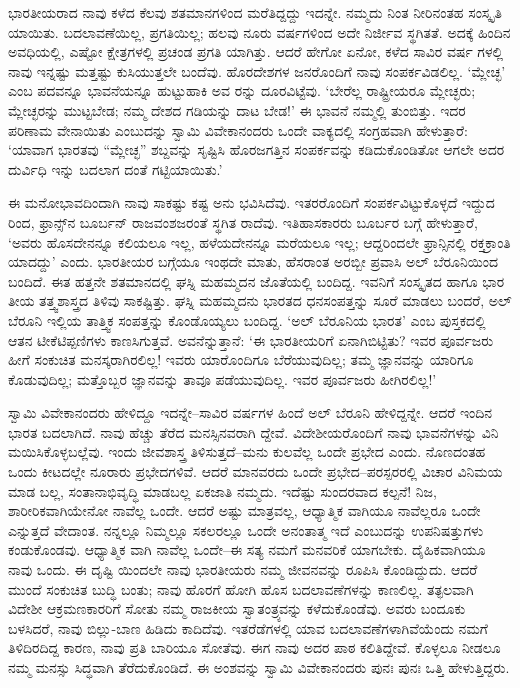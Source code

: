 ಭಾರತೀಯರಾದ ನಾವು ಕಳೆದ ಕೆಲವು ಶತಮಾನಗಳಿಂದ ಮರೆತಿದ್ದದ್ದು ಇದನ್ನೇ. ನಮ್ಮದು ನಿಂತ ನೀರಿನಂತಹ ಸಂಸ್ಕೃತಿ ಯಾಯಿತು. ಬದಲಾವಣೆಯಿಲ್ಲ, ಪ್ರಗತಿಯಿಲ್ಲ; ಹಲವು ನೂರು ವರ್ಷಗಳಿಂದ ಅದೇ ನಿರ್ಜೀವ ಸ್ಥಗಿತತೆ. ಅದಕ್ಕೆ ಹಿಂದಿನ ಅವಧಿಯಲ್ಲಿ, ಎಷ್ಟೋ ಕ್ಷೇತ್ರಗಳಲ್ಲಿ ಪ್ರಚಂಡ ಪ್ರಗತಿ ಯಾಗಿತ್ತು. ಆದರೆ ಹೇಗೋ ಏನೋ, ಕಳೆದ ಸಾವಿರ ವರ್ಷ ಗಳಲ್ಲಿ ನಾವು ಇನ್ನಷ್ಟು ಮತ್ತಷ್ಟು ಕುಸಿಯುತ್ತಲೇ ಬಂದೆವು. ಹೊರದೇಶಗಳ ಜನರೊಂದಿಗೆ ನಾವು ಸಂಪರ್ಕವಿಡಲಿಲ್ಲ. ‘ಮ್ಲೇಚ್ಛ’ ಎಂಬ ಪದವನ್ನೂ ಭಾವನೆಯನ್ನೂ ಹುಟ್ಟುಹಾಕಿ ಅವ ರನ್ನು ದೂರವಿಟ್ಟೆವು. ‘ಬೇರೆಲ್ಲ ರಾಷ್ಟ್ರೀಯರೂ ಮ್ಲೇಚ್ಛರು; ಮ್ಲೇಚ್ಛರನ್ನು ಮುಟ್ಟಬೇಡ; ನಮ್ಮ ದೇಶದ ಗಡಿಯನ್ನು ದಾಟ ಬೇಡ!’ ಈ ಭಾವನೆ ನಮ್ಮಲ್ಲಿ ತುಂಬಿತ್ತು. ಇದರ ಪರಿಣಾಮ ವೇನಾಯಿತು ಎಂಬುದನ್ನು ಸ್ವಾಮಿ ವಿವೇಕಾನಂದರು ಒಂದೇ ವಾಕ್ಯದಲ್ಲಿ ಸಂಗ್ರಹವಾಗಿ ಹೇಳುತ್ತಾರೆ: ‘ಯಾವಾಗ ಭಾರತವು “ಮ್ಲೇಚ್ಛ” ಶಬ್ದವನ್ನು ಸೃಷ್ಟಿಸಿ ಹೊರಜಗತ್ತಿನ ಸಂಪರ್ಕವನ್ನು ಕಡಿದುಕೊಂಡಿತೋ ಆಗಲೇ ಅದರ ದುರ್ವಿಧಿ ಇನ್ನು ಬದಲಾಗ ದಂತೆ ಗಟ್ಟಿಯಾಯಿತು.’

ಈ ಮನೋಭಾವದಿಂದಾಗಿ ನಾವು ಸಾಕಷ್ಟು ಕಷ್ಟ ಅನು ಭವಿಸಿದೆವು. ಇತರರೊಂದಿಗೆ ಸಂಪರ್ಕವಿಟ್ಟುಕೊಳ್ಳದೆ ಇದ್ದುದ ರಿಂದ, ಫ್ರಾನ್ಸ್​ನ ಬೂರ್ಬನ್ ರಾಜವಂಶಜರಂತೆ ಸ್ಥಗಿತ ರಾದೆವು. ಇತಿಹಾಸಕಾರರು ಬೂರ್ಬರ ಬಗ್ಗೆ ಹೇಳುತ್ತಾರೆ, ‘ಅವರು ಹೊಸದೇನನ್ನೂ ಕಲಿಯಲೂ ಇಲ್ಲ, ಹಳೆಯದೇನನ್ನೂ ಮರೆಯಲೂ ಇಲ್ಲ; ಆದ್ದರಿಂದಲೇ ಫ್ರಾನ್ಸಿನಲ್ಲಿ ರಕ್ತಕ್ರಾಂತಿ ಯಾದದ್ದು’ ಎಂದು. ಭಾರತೀಯರ ಬಗ್ಗೆಯೂ ಇಂಥದೇ ಮಾತು, ಹೆಸರಾಂತ ಅರಬ್ಬೀ ಪ್ರವಾಸಿ ಅಲ್ ಬೆರೂನಿಯಿಂದ ಬಂದಿದೆ. ಈತ ಹತ್ತನೇ ಶತಮಾನದಲ್ಲಿ ಘಸ್ನಿ ಮಹಮ್ಮದನ ಜೊತೆಯಲ್ಲಿ ಬಂದಿದ್ದ. ಇವನಿಗೆ ಸಂಸ್ಕೃತದ ಹಾಗೂ ಭಾರ ತೀಯ ತತ್ತ್ವಶಾಸ್ತ್ರದ ತಿಳಿವು ಸಾಕಷ್ಟಿತ್ತು. ಘಸ್ನಿ ಮಹಮ್ಮದನು ಭಾರತದ ಧನಸಂಪತ್ತನ್ನು ಸೂರೆ ಮಾಡಲು ಬಂದರೆ, ಅಲ್ ಬೆರೂನಿ ಇಲ್ಲಿಯ ತಾತ್ತ್ವಿಕ ಸಂಪತ್ತನ್ನು ಕೊಂಡೊಯ್ಯಲು ಬಂದಿದ್ದ. ‘ಅಲ್ ಬೆರೂನಿಯ ಭಾರತ’ ಎಂಬ ಪುಸ್ತಕದಲ್ಲಿ ಆತನ ಟೀಕೆಟಿಪ್ಪಣಿಗಳು ಕಾಣಸಿಗುತ್ತವೆ. ಅವನೆನ್ನುತ್ತಾನೆ: ‘ಈ ಭಾರತೀಯರಿಗೆ ಏನಾಗಿಬಿಟ್ಟಿತು? ಇವರ ಪೂರ್ವಜರು ಹೀಗೆ ಸಂಕುಚಿತ ಮನಸ್ಕರಾಗಿರಲಿಲ್ಲ! ಇವರು ಯಾರೊಂದಿಗೂ ಬೆರೆಯುವುದಿಲ್ಲ; ತಮ್ಮ ಜ್ಞಾನವನ್ನು ಯಾರಿಗೂ ಕೊಡುವುದಿಲ್ಲ; ಮತ್ತೊಬ್ಬರ ಜ್ಞಾನವನ್ನು ತಾವೂ ಪಡೆಯುವುದಿಲ್ಲ. ಇವರ ಪೂರ್ವಜರು ಹೀಗಿರಲಿಲ್ಲ!’

ಸ್ವಾಮಿ ವಿವೇಕಾನಂದರು ಹೇಳಿದ್ದೂ ಇದನ್ನೇ–ಸಾವಿರ ವರ್ಷಗಳ ಹಿಂದೆ ಅಲ್ ಬೆರೂನಿ ಹೇಳಿದ್ದನ್ನೇ. ಆದರೆ ಇಂದಿನ ಭಾರತ ಬದಲಾಗಿದೆ. ನಾವು ಹೆಚ್ಚು ತೆರೆದ ಮನಸ್ಸಿನವರಾಗಿ ದ್ದೇವೆ. ವಿದೇಶೀಯರೊಂದಿಗೆ ನಾವು ಭಾವನೆಗಳನ್ನು ವಿನಿ ಮಯಿಸಿಕೊಳ್ಳಬಲ್ಲೆವು. ಇಂದು ಜೀವಶಾಸ್ತ್ರ ತಿಳಿಸುತ್ತದೆ–ಮನು ಕುಲವೆಲ್ಲ ಒಂದೇ ಪ್ರಭೇದ ಎಂದು. ನೊಣದಂತಹ ಒಂದು ಕೀಟದಲ್ಲೇ ನೂರಾರು ಪ್ರಭೇದಗಳಿವೆ. ಆದರೆ ಮಾನವರದು ಒಂದೇ ಪ್ರಭೇದ–ಪರಸ್ಪರರಲ್ಲಿ ವಿಚಾರ ವಿನಿಮಯ ಮಾಡ ಬಲ್ಲ, ಸಂತಾನಾಭಿವೃದ್ಧಿ ಮಾಡಬಲ್ಲ ಏಕಜಾತಿ ನಮ್ಮದು. ಇದೆಷ್ಟು ಸುಂದರವಾದ ಕಲ್ಪನೆ! ನಿಜ, ಶಾರೀರಿಕವಾಗಿಯೇನೋ ನಾವೆಲ್ಲ ಒಂದೇ. ಆದರೆ ಅಷ್ಟು ಮಾತ್ರವಲ್ಲ, ಆಧ್ಯಾತ್ಮಿಕ ವಾಗಿಯೂ ನಾವೆಲ್ಲರೂ ಒಂದೇ ಎನ್ನುತ್ತದೆ ವೇದಾಂತ. ನನ್ನಲ್ಲೂ ನಿಮ್ಮಲ್ಲೂ ಸಕಲರಲ್ಲೂ ಒಂದೇ ಅನಂತಾತ್ಮ ಇದೆ ಎಂಬುದನ್ನು ಉಪನಿಷತ್ತುಗಳು ಕಂಡುಕೊಂಡವು. ಆಧ್ಯಾತ್ಮಿಕ ವಾಗಿ ನಾವೆಲ್ಲ ಒಂದೇ–ಈ ಸತ್ಯ ನಮಗೆ ಮನವರಿಕೆ ಯಾಗಬೇಕು. ದೈಹಿಕವಾಗಿಯೂ ನಾವು ಒಂದು. ಈ ದೃಷ್ಟಿ ಯಿಂದಲೇ ನಾವು ಭಾರತೀಯರು ನಮ್ಮ ಜೀವನವನ್ನು ರೂಪಿಸಿ ಕೊಂಡಿದ್ದುದು. ಆದರೆ ಮುಂದೆ ಸಂಕುಚಿತ ಬುದ್ಧಿ ಬಂತು; ನಾವು ಹೊರಗೆ ಹೋಗಿ ಹೊಸ ಬದಲಾವಣೆಗಳನ್ನು ಕಾಣಲಿಲ್ಲ. ತತ್ಫಲವಾಗಿ ವಿದೇಶೀ ಆಕ್ರಮಣಕಾರರಿಗೆ ಸೋತು ನಮ್ಮ ರಾಜಕೀಯ ಸ್ವಾತಂತ್ರ್ಯವನ್ನು ಕಳೆದುಕೊಂಡೆವು. ಅವರು ಬಂದೂಕು ಬಳಸಿದರೆ, ನಾವು ಬಿಲ್ಲು-ಬಾಣ ಹಿಡಿದು ಕಾದಿದೆವು. ಇತರೆಡೆಗಳಲ್ಲಿ ಯಾವ ಬದಲಾವಣೆಗಳಾಗಿವೆಯೆಂದು ನಮಗೆ ತಿಳಿದಿರದಿದ್ದ ಕಾರಣ, ನಾವು ಪ್ರತಿ ಬಾರಿಯೂ ಸೋತೆವು. ಈಗ ನಾವು ಅದರ ಪಾಠ ಕಲಿತಿದ್ದೇವೆ. ಕೊಳ್ಳಲೂ ನೀಡಲೂ ನಮ್ಮ ಮನಸ್ಸು ಸಿದ್ಧವಾಗಿ ತೆರೆದುಕೊಂಡಿದೆ. ಈ ಅಂಶವನ್ನು ಸ್ವಾಮಿ ವಿವೇಕಾನಂದರು ಪುನಃ ಪುನಃ ಒತ್ತಿ ಹೇಳುತ್ತಿದ್ದರು. 

